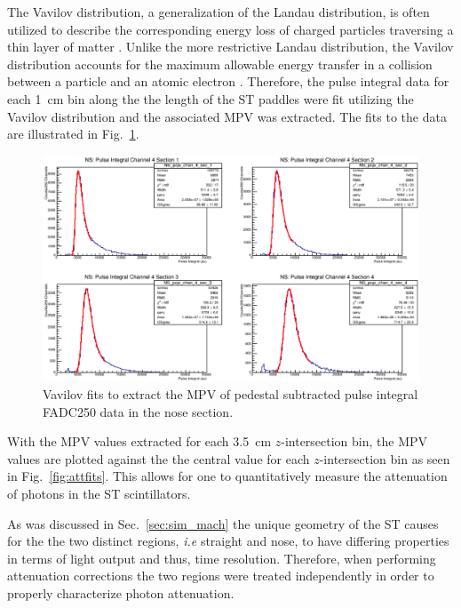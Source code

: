 The Vavilov distribution, a generalization of the Landau distribution, is often utilized to describe the corresponding energy loss of charged particles traversing a thin layer of matter \cite{seltzer_1964}.  Unlike the more restrictive Landau distribution, the Vavilov distribution accounts for the maximum allowable energy transfer in a collision between a particle and an atomic electron \cite{schorr_1973}.  Therefore, the pulse integral data for each 1~cm bin along the the length of the ST paddles were fit utilizing the Vavilov distribution and the associated MPV was extracted.  The fits to the data are illustrated in Fig.~\ref{fig:pisecnosefits}. 
	\begin{figure}
		\centering
		\includegraphics[width=1.0\columnwidth]{calibration/figs/pi_sec_nose_fits}
		\caption{Vavilov fits to extract the MPV of pedestal subtracted pulse integral FADC250 data in the nose section.}
		\label{fig:pisecnosefits}
	\end{figure}
With the MPV values extracted for each 3.5~cm $z$-intersection bin, the MPV values are plotted against the the central value for each $z$-intersection bin as seen in Fig.~\ref{fig:attfits}.  This allows for one to quantitatively measure the attenuation of photons in the ST scintillators.

As was discussed in Sec.~\ref{sec:sim_mach} the unique geometry of the ST causes for the the two distinct regions, \textit{i.e} straight and nose, to have differing properties in terms of light output and thus, time resolution.  Therefore, when performing attenuation corrections the two regions were treated independently in order to properly characterize photon attenuation.  

